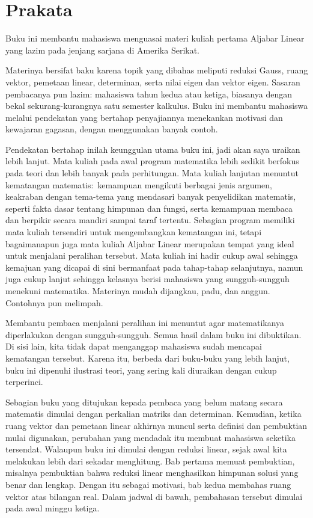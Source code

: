 {\setlength{\parskip}{.7ex}  %
\chapter*{Prakata}
Buku ini membantu mahasiswa menguasai materi kuliah pertama Aljabar Linear
yang lazim pada jenjang sarjana di Amerika Serikat.

Materinya bersifat baku karena topik yang dibahas meliputi
reduksi Gauss,
ruang vektor, pemetaan linear,
determinan, serta nilai eigen dan vektor eigen.
Sasaran pembacanya pun lazim:
mahasiswa tahun kedua atau ketiga, biasanya dengan bekal
sekurang-kurangnya satu semester kalkulus.
Buku ini membantu mahasiswa melalui pendekatan yang bertahap\Dash
penyajiannya menekankan motivasi dan kewajaran gagasan,
dengan menggunakan banyak contoh.

Pendekatan bertahap inilah keunggulan utama buku ini,
jadi akan saya uraikan lebih lanjut.
Mata kuliah pada awal program matematika
lebih sedikit berfokus pada teori dan lebih banyak pada perhitungan.
Mata kuliah lanjutan
menuntut kematangan matematis:~kemampuan mengikuti berbagai
jenis argumen,
keakraban dengan
tema-tema yang mendasari banyak penyelidikan matematis, seperti
fakta dasar tentang himpunan dan fungsi,
serta kemampuan membaca dan berpikir secara mandiri sampai taraf tertentu.
Sebagian program memiliki mata kuliah tersendiri untuk mengembangkan kematangan ini,
tetapi bagaimanapun juga mata kuliah Aljabar Linear
merupakan tempat yang ideal untuk menjalani peralihan tersebut.
Mata kuliah ini hadir cukup awal sehingga kemajuan yang dicapai di sini
bermanfaat pada tahap-tahap selanjutnya,
namun juga cukup lanjut sehingga kelasnya berisi
mahasiswa yang sungguh-sungguh menekuni matematika.
Materinya mudah dijangkau, padu, dan anggun.
Contohnya pun melimpah.

Membantu pembaca menjalani peralihan ini
menuntut agar matematikanya diperlakukan dengan sungguh-sungguh.
Semua hasil dalam buku ini dibuktikan.
Di sisi lain, kita tidak dapat
menganggap mahasiswa sudah mencapai kematangan tersebut.
Karena itu,
berbeda dari buku-buku yang lebih lanjut,
buku ini dipenuhi ilustrasi teori,
yang sering kali diuraikan dengan cukup terperinci.

Sebagian buku yang ditujukan kepada pembaca yang belum matang secara matematis
dimulai dengan perkalian matriks dan determinan.
Kemudian, ketika
ruang vektor dan pemetaan linear akhirnya muncul
serta definisi dan pembuktian mulai digunakan, perubahan yang mendadak itu
membuat mahasiswa seketika tersendat.
Walaupun buku ini dimulai dengan
reduksi linear, sejak awal
kita melakukan lebih dari sekadar menghitung.
Bab pertama
memuat pembuktian, misalnya pembuktian bahwa reduksi linear menghasilkan
himpunan solusi yang benar dan lengkap.
Dengan itu sebagai motivasi,
bab kedua membahas ruang vektor atas bilangan real.
Dalam jadwal di bawah, pembahasan tersebut dimulai pada awal minggu ketiga.

}
